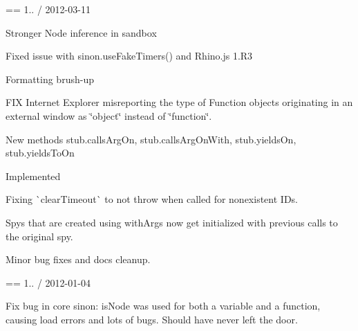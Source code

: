 == 1.. / 2012-\/03-\/11
\begin{DoxyItemize}
\item Stronger Node inference in sandbox
\item Fixed issue with sinon.\+use\+Fake\+Timers() and Rhino.\+js 1.\+R3
\item Formatting brush-\/up
\item F\+IX Internet Explorer misreporting the type of Function objects originating in an external window as \char`\"{}object\char`\"{} instead of \char`\"{}function\char`\"{}.
\item New methods stub.\+calls\+Arg\+On, stub.\+calls\+Arg\+On\+With, stub.\+yields\+On, stub.\+yields\+To\+On
\item Implemented
\item Fixing \`{}clear\+Timeout\`{} to not throw when called for nonexistent I\+Ds.
\item Spys that are created using \textquotesingle{}with\+Args\textquotesingle{} now get initialized with previous calls to the original spy.
\item Minor bug fixes and docs cleanup.
\end{DoxyItemize}

== 1.. / 2012-\/01-\/04
\begin{DoxyItemize}
\item Fix bug in core sinon\+: is\+Node was used for both a variable and a function, causing load errors and lots of bugs. Should have never left the door.
\end{DoxyItemize}

